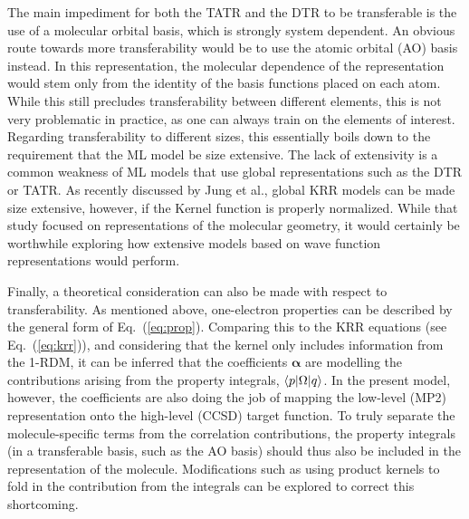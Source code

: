 The main impediment for both the TATR and the DTR to be transferable is the use of a molecular orbital basis, which is strongly system dependent. An obvious route towards more transferability would be to use the atomic orbital (AO) basis instead. In this representation, the molecular dependence of the representation would stem only from the identity of the basis functions placed on each atom. While this still precludes transferability between different elements, this is not very problematic in practice, as one can always train on the elements of interest.
Regarding transferability to different sizes, this essentially boils down to the requirement that the ML model be size extensive. The lack of extensivity is a common weakness of ML models that use global representations such as the DTR or TATR. As recently discussed by Jung et al., global KRR models can be made size extensive, however, if the Kernel function is properly normalized\cite{Jung2020}. While that study focused on representations of the molecular geometry, it would certainly be worthwhile exploring how extensive models based on wave function representations would perform.

Finally, a theoretical consideration can also be made with respect to transferability. As mentioned above, one-electron properties can be described by the general form of Eq.~(\ref{eq:prop}). Comparing this to the KRR equations (see Eq.~(\ref{eq:krr})), and considering that the kernel only includes information from the 1-RDM, it can be inferred that the coefficients $\mathbf{\alpha}$ are modelling the contributions arising from the property integrals, $\langle p |\Omega| q \rangle$.
In the present model, however, the coefficients are also doing the job of mapping the low-level (MP2) representation onto the high-level (CCSD) target function. To truly separate the molecule-specific terms from the correlation contributions, the property integrals (in a transferable basis, such as the AO basis) should thus also be included in the representation of the molecule. 
Modifications such as using product kernels to fold in the contribution from the integrals can be explored to correct this shortcoming.

